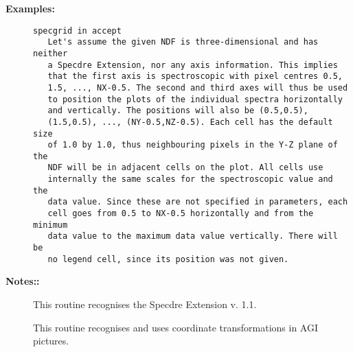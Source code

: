 \begin{description}
\item [{\bf Examples:}]
\begin{verbatim}
specgrid in accept
   Let's assume the given NDF is three-dimensional and has neither
   a Specdre Extension, nor any axis information. This implies
   that the first axis is spectroscopic with pixel centres 0.5,
   1.5, ..., NX-0.5. The second and third axes will thus be used
   to position the plots of the individual spectra horizontally
   and vertically. The positions will also be (0.5,0.5),
   (1.5,0.5), ..., (NY-0.5,NZ-0.5). Each cell has the default size
   of 1.0 by 1.0, thus neighbouring pixels in the Y-Z plane of the
   NDF will be in adjacent cells on the plot. All cells use
   internally the same scales for the spectroscopic value and the
   data value. Since these are not specified in parameters, each
   cell goes from 0.5 to NX-0.5 horizontally and from the minimum
   data value to the maximum data value vertically. There will be
   no legend cell, since its position was not given.

\end{verbatim}

\item [{\bf Notes::}]
This routine recognises the Specdre Extension v. 1.1.

This routine recognises and uses coordinate transformations in
AGI pictures.
\end{description}
